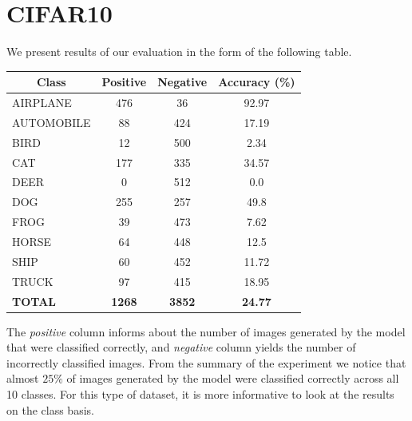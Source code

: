 \documentclass[12pt,a4paper,openany]{book}
\begin{document}
\section{CIFAR10}
\noindent We present results of our evaluation in the form of the following table. \\
\begin{table}[h!]
\centering
\begin{tabular}{|l|c|c|c|}
\hline
\multicolumn{1}{|c|}{\textbf{Class}} & \textbf{Positive} & \textbf{Negative} & \textbf{Accuracy (\%)}       \\ \hline
AIRPLANE                             & 476               & 36                & {\color[HTML]{32CB00} 92.97} \\ \hline
AUTOMOBILE                           & 88                & 424               & 17.19                        \\ \hline
BIRD                                 & 12                & 500               & 2.34                         \\ \hline
CAT                                  & 177               & 335               & 34.57                        \\ \hline
DEER                                 & 0                 & 512               & {\color[HTML]{FE0000} 0.0}   \\ \hline
DOG                                  & 255               & 257               & 49.8                         \\ \hline
FROG                                 & 39                & 473               & 7.62                         \\ \hline
HORSE                                & 64                & 448               & 12.5                         \\ \hline
SHIP                                 & 60                & 452               & 11.72                        \\ \hline
TRUCK                                & 97                & 415               & 18.95                        \\ \hline
\textbf{TOTAL}                       & \textbf{1268}     & \textbf{3852}     & \textbf{24.77}               \\ \hline
\end{tabular}
\end{table}
\newline
\noindent The \textit{positive} column informs about the number of images generated by the model that were classified correctly, and \textit{negative} column yields the number of incorrectly classified images. From the summary of the experiment we notice that almost $25\%$ of images generated by the model were classified correctly across all 10 classes. For this type of dataset, it is more informative to look at the results on the class basis.
\end{document}
